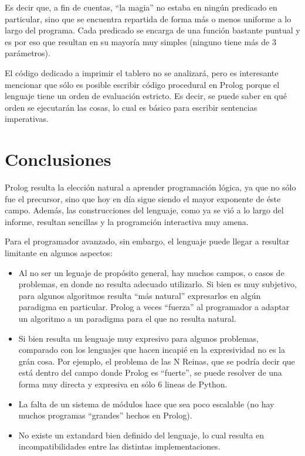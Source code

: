 \documentclass[12pt,titlepage]{article}
\begin{document}
Es decir que, a fin de cuentas, ``la magia'' no estaba en ningún predicado en particular, sino que se encuentra repartida de forma más o menos uniforme a lo largo del programa. Cada predicado se encarga de una función bastante puntual y es por eso que resultan en su mayoría muy simples (ninguno tiene más de 3 parámetros). 

El código dedicado a imprimir el tablero no se analizará, pero es interesante mencionar que sólo es posible escribir código procedural en Prolog porque el lenguaje tiene un orden de evaluación estricto. Es decir, se puede saber en qué orden se ejecutarán las cosas, lo cual es básico para escribir sentencias imperativas.

\newpage
\section{Conclusiones} 

Prolog resulta la elección natural a aprender programación lógica, ya que no sólo fue el precursor, sino que hoy en día sigue siendo el mayor exponente de éste campo. Además, las construcciones del lenguaje, como ya se vió a lo largo del informe, resultan sencillas y la programción interactiva muy amena.

Para el programador avanzado, sin embargo, el lenguaje puede llegar a resultar limitante en algunos aspectos:
\begin{itemize}
  \item Al no ser un leguaje de propósito general, hay muchos campos, o casos de problemas, en donde no resulta adecuado utilizarlo. Si bien es muy subjetivo, para algunos algoritmos resulta ``más natural'' expresarlos en algún paradigma en particular. Prolog a veces ``fuerza'' al programador a adaptar un algoritmo a un paradigma para el que no resulta natural.
  \item Si bien resulta un lenguaje muy expresivo para algunos problemas, comparado con los lenguajes que hacen incapié en la expresividad no es la grán cosa. Por ejemplo, el problema de las N Reinas, que se podría decir que está dentro del campo donde Prolog es ``fuerte'', se puede resolver de una forma muy directa y expresiva en sólo 6 lineas de Python\cite{nreinaspython}.
  \item La falta de un sistema de módulos hace que sea poco escalable (no hay muchos programas ``grandes'' hechos en Prolog).
  \item No existe un extandard bien definido del lenguaje, lo cual resulta en incompatibilidades entre las distintas implementaciones.
\end{itemize}
\end{document}
